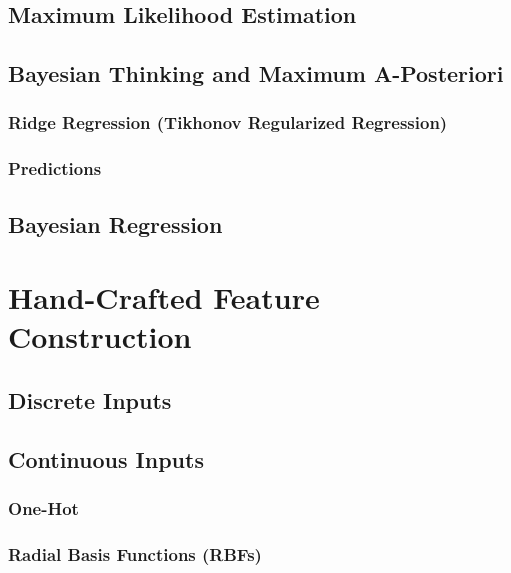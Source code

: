 		\subsection{Maximum Likelihood Estimation} %

		\subsection{Bayesian Thinking and Maximum A-Posteriori} %

			\subsubsection{Ridge Regression (Tikhonov Regularized Regression)} %

			\subsubsection{Predictions} %

		\subsection{Bayesian Regression} %

	\section{Hand-Crafted Feature Construction} %

		\subsection{Discrete Inputs} %

		\subsection{Continuous Inputs} %

			\subsubsection{One-Hot} %

			\subsubsection{Radial Basis Functions (RBFs)} %

